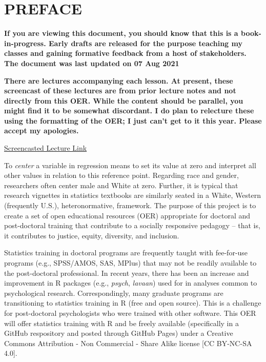 \documentclass[
  english,
]{book}
\begin{document}
\hypertarget{preface}{%
\chapter*{PREFACE}\label{preface}}

\textbf{If you are viewing this document, you should know that this is a book-in-progress. Early drafts are released for the purpose teaching my classes and gaining formative feedback from a host of stakeholders. The document was last updated on 07 Aug 2021}

\textbf{There are lectures accompanying each lesson. At present, these screencast of these lectures are from prior lecture notes and not directly from this OER. While the content should be parallel, you might find it to be somewhat discordant. I do plan to relecture these using the formatting of the OER; I just can't get to it this year. Please accept my apologies.}

\href{https://spu.hosted.panopto.com/Panopto/Pages/Viewer.aspx?id=c932455e-ef06-444a-bdca-acf7012d759a}{Screencasted Lecture Link}

To \emph{center} a variable in regression means to set its value at zero and interpret all other values in relation to this reference point. Regarding race and gender, researchers often center male and White at zero. Further, it is typical that research vignettes in statistics textbooks are similarly seated in a White, Western (frequently U.S.), heteronormative, framework. The purpose of this project is to create a set of open educational resources (OER) appropriate for doctoral and post-doctoral training that contribute to a socially responsive pedagogy -- that is, it contributes to justice, equity, diversity, and inclusion.

Statistics training in doctoral programs are frequently taught with fee-for-use programs (e.g., SPSS/AMOS, SAS, MPlus) that may not be readily available to the post-doctoral professional. In recent years, there has been an increase and improvement in R packages (e.g., \emph{psych}, \emph{lavaan}) used for in analyses common to psychological research. Correspondingly, many graduate programs are transitioning to statistics training in R (free and open source). This is a challenge for post-doctoral psychologists who were trained with other software. This OER will offer statistics training with R and be freely available (specifically in a GitHub respository and posted through GitHub Pages) under a Creative Commons Attribution - Non Commercial - Share Alike license {[}CC BY-NC-SA 4.0{]}.
\end{document}
